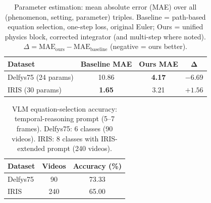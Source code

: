 
\begin{table}[t]
  \centering
  \caption{Parameter estimation: mean absolute error (MAE) over all (phenomenon, setting, parameter) triples. Baseline = path-based equation selection, one-step loss, original Euler; Ours = unified physics block, corrected integrator (and multi-step where noted). $\Delta = \mathrm{MAE}_{\mathrm{ours}} - \mathrm{MAE}_{\mathrm{baseline}}$ (negative = ours better).}
  \label{tab:summary_param_mae}
  \small
  \setlength{\tabcolsep}{6pt}
  \renewcommand{\arraystretch}{1.2}
  \begin{tabular}{@{}lccc@{}}
    \toprule
    \textbf{Dataset} & \textbf{Baseline MAE} & \textbf{Ours MAE} & $\bm{\Delta}$ \\
    \midrule
    Delfys75 (24 params)  & 10.86 & \cellcolor{bestcolor}\textbf{4.17} & $-6.69$ \\
    IRIS (30 params)      & \cellcolor{bestcolor}\textbf{1.65} & 3.21 & $+1.56$ \\
    \bottomrule
  \end{tabular}
\end{table}

\begin{table}[t]
  \centering
  \caption{VLM equation-selection accuracy: temporal-reasoning prompt (5--7 frames). Delfys75: 6 classes (90 videos). IRIS: 8 classes with IRIS-extended prompt (240 videos).}
  \label{tab:summary_vlm}
  \small
  \setlength{\tabcolsep}{6pt}
  \renewcommand{\arraystretch}{1.2}
  \begin{tabular}{@{}lcc@{}}
    \toprule
    \textbf{Dataset} & \textbf{Videos} & \textbf{Accuracy (\%)} \\
    \midrule
    Delfys75 & 90  & 73.33 \\
    IRIS     & 240 & 65.00 \\
    \bottomrule
  \end{tabular}
\end{table}


